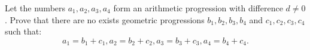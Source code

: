 Let the numbers $a_1,a_2,a_3,a_4$ form an arithmetic progression with difference $d\ne0$. Prove that there are no exists geometric progressions $b_1,b_2,b_3,b_4$ and $c_1,c_2,c_3,c_4$ such that:
$$a_1=b_1+c_1,a_2=b_2+c_2,a_3=b_3+c_3,a_4=b_4+c_4.$$